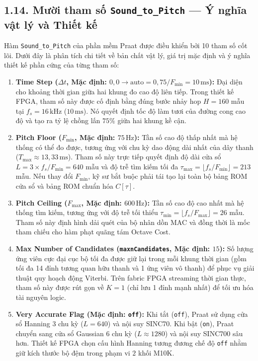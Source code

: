 \subsection*{1.14. Mười tham số \texttt{Sound\_to\_Pitch} --- Ý nghĩa vật lý và Thiết kế}

Hàm \texttt{Sound\_to\_Pitch} của phần mềm Praat được điều khiển bởi 10 tham số cốt lõi. Dưới đây là phân tích chi tiết về bản chất vật lý, giá trị mặc định và ý nghĩa thiết kế phần cứng của từng tham số:

\begin{enumerate}[leftmargin=1.4em]
    \item \textbf{Time Step ($\Delta t$, Mặc định: $0{,}0\to\text{auto} = 0{,}75 / F_{\min} = 10\,\text{ms}$):} Đại diện cho khoảng thời gian giữa hai khung đo cao độ liên tiếp. Trong thiết kế FPGA, tham số này được cố định bằng đúng bước nhảy hop $H = 160$ mẫu tại $f_s = 16\,\text{kHz}$ ($10\,\text{ms}$). Nó quyết định tốc độ làm tươi của đường cong cao độ và tạo ra tỷ lệ chồng lấn $75\%$ giữa hai khung kề cận.
    \item \textbf{Pitch Floor ($F_{\min}$, Mặc định: $75\,\text{Hz}$):} Tần số cao độ thấp nhất mà hệ thống có thể đo được, tương ứng với chu kỳ dao động dài nhất của dây thanh ($T_{\max} \approx 13{,}33\,\text{ms}$). Tham số này trực tiếp quyết định độ dài cửa sổ $L = 3 \times f_s / F_{\min} = 640$ mẫu và độ trễ tìm kiếm tối đa $\tau_{\max} = \lfloor f_s / F_{\min} \rfloor = 213$ mẫu. Nếu thay đổi $F_{\min}$, kỹ sư bắt buộc phải tái tạo lại toàn bộ bảng ROM cửa sổ và bảng ROM chuẩn hóa $C[\tau]$.
    \item \textbf{Pitch Ceiling ($F_{\max}$, Mặc định: $600\,\text{Hz}$):} Tần số cao độ cao nhất mà hệ thống tìm kiếm, tương ứng với độ trễ tối thiểu $\tau_{\min} = \lfloor f_s / F_{\max} \rfloor = 26$ mẫu. Tham số này định hình dải quét của bộ nhân dồn MAC và đồng thời là mốc tham chiếu cho hàm phạt quãng tám Octave Cost.
    \item \textbf{Max Number of Candidates (\texttt{maxnCandidates}, Mặc định: $15$):} Số lượng ứng viên cực đại cục bộ tối đa được giữ lại trong mỗi khung thời gian (gồm tối đa 14 đỉnh tương quan hữu thanh và 1 ứng viên vô thanh) để phục vụ giải thuật quy hoạch động Viterbi. Trên fabric FPGA streaming thời gian thực, tham số này được rút gọn về $K = 1$ (chỉ lưu 1 đỉnh mạnh nhất) để tối ưu hóa tài nguyên logic.
    \item \textbf{Very Accurate Flag (Mặc định: \texttt{off}):} Khi tắt (\texttt{off}), Praat sử dụng cửa sổ Hanning 3 chu kỳ ($L = 640$) và nội suy SINC70. Khi bật (\texttt{on}), Praat chuyển sang cửa sổ Gaussian 6 chu kỳ ($L \approx 1280$) và nội suy SINC700 sâu hơn. Thiết kế FPGA chọn cấu hình Hanning tương đương chế độ \texttt{off} nhằm giữ kích thước bộ đệm trong phạm vi $2$ khối M10K.

\end{enumerate}
